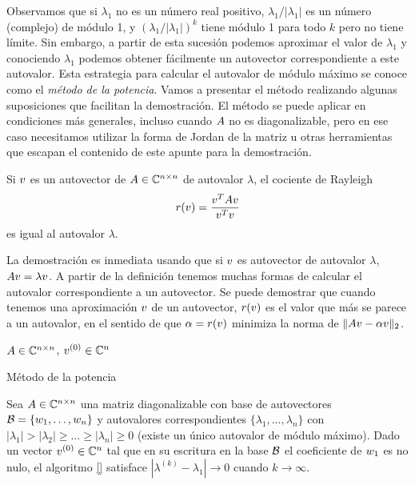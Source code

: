 Observamos que si $\lambda_1$ no es un número real positivo, $\lambda_1/|\lambda_1|$ es un número (complejo) de módulo 1, y $(\lambda_1 / |\lambda_1|)^k$ tiene módulo 1 para todo $k$ pero no tiene límite. Sin embargo, a partir de esta sucesión podemos aproximar el valor de $\lambda_1$ y conociendo $\lambda_1$ podemos obtener fácilmente un autovector correspondiente a este autovalor. Esta estrategia para calcular el autovalor de módulo máximo se conoce como el \emph{método de la potencia}. Vamos a presentar el método realizando algunas suposiciones que facilitan la demostración. El método se puede aplicar en condiciones más generales, incluso cuando $\Ab$ no es diagonalizable, pero en ese caso necesitamos utilizar la forma de Jordan de la matriz u otras herramientas que escapan el contenido de este apunte para la demostración.


\begin{lema}
Si $\vb$ es un autovector de $\Ab \in \Cnn$ de autovalor $\lambda$, el cociente de Rayleigh
$$
r(\vb) = \frac{\vb^T \Ab \vb}{\vb^T \vb}
$$
es igual al autovalor $\lambda$.
\end{lema}

La demostración es inmediata usando que si $\vb$ es autovector de autovalor $\lambda$, $\Ab \vb = \lambda \vb$.
A partir de la definición tenemos muchas formas de calcular el autovalor correspondiente a un autovector. Se puede demostrar que cuando tenemos una aproximación $\vb$ de un autovector, $r(\vb)$ es el valor que más se parece a un autovalor, en el sentido de que $\alpha = r(\vb)$ minimiza la norma de $\|\Ab\vb - \alpha \vb\|_2$.

\begin{algorithm}[H]
\SetAlgoLined
$\Ab \in \C^{n \times n}$, $\vb^{(0)} \in \C^n$\;
 \caption{Método de la potencia}
\end{algorithm}


\begin{teo}
Sea $\Ab \in \Cnn$ una matriz diagonalizable con base de autovectores $\B = \{\wb_1, \dots, \wb_n\}$ y autovalores correspondientes $\{\lambda_1, \dots, \lambda_n\}$ con $|\lambda_1| > |\lambda_2| \ge \dots \ge |\lambda_n| \ge 0$ (existe un único autovalor de módulo máximo). Dado un vector $\vb^{(0)} \in \C^n$ tal que en su escritura en la base $\mathcal B$ el coeficiente de $\wb_1$ es no nulo, el algoritmo \ref{} satisface $|\lambda^{(k)} - \lambda_1| \rightarrow 0$ cuando $k \rightarrow \infty$.
\end{teo}

